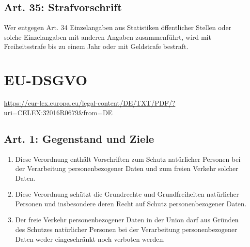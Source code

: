 \documentclass[A4, 12pt]{scrbook}
\begin{document}
    \section{Art. 35: Strafvorschrift}
        Wer entgegen Art. 34 Einzelangaben aus Statistiken öffentlicher Stellen oder solche Einzelangaben mit anderen Angaben zusammenführt, wird mit Freiheitsstrafe bis zu einem Jahr oder mit Geldstrafe bestraft.
\chapter{EU-DSGVO}
\newline
\url{https://eur-lex.europa.eu/legal-content/DE/TXT/PDF/?uri=CELEX:32016R0679&from=DE}
    \section{Art. 1: Gegenstand und Ziele}
        \begin{enumerate}[label=(\arabic*)]
            \item Diese Verordnung enthält Vorschriften zum Schutz natürlicher Personen bei der Verarbeitung personenbezogener Daten und zum freien Verkehr solcher Daten.
            \item Diese Verordnung schützt die Grundrechte und Grundfreiheiten natürlicher Personen und insbesondere deren Recht auf Schutz personenbezogener Daten.
            \item Der freie Verkehr personenbezogener Daten in der Union darf aus Gründen des Schutzes natürlicher Personen bei der Verarbeitung personenbezogener Daten weder eingeschränkt noch verboten werden. 
        \end{enumerate}
\end{document}
